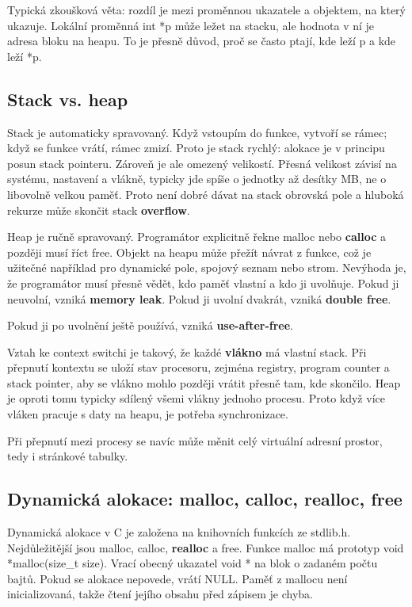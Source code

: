 Typická zkoušková věta: rozdíl je mezi proměnnou ukazatele a objektem, na který ukazuje. Lokální proměnná int *p může ležet na stacku, ale hodnota v ní je adresa bloku na heapu. To je přesně důvod, proč se často ptají, kde leží p a kde leží *p.

\subsection*{Stack vs. heap}

Stack je automaticky spravovaný. Když vstoupím do funkce, vytvoří se rámec; když se funkce vrátí, rámec zmizí. Proto je stack rychlý: alokace je v principu posun stack pointeru. Zároveň je ale omezený velikostí. Přesná velikost závisí na systému, nastavení a vlákně, typicky jde spíše o jednotky až desítky MB, ne o libovolně velkou paměť. Proto není dobré dávat na stack obrovská pole a hluboká rekurze může skončit stack \textbf{overflow}.

Heap je ručně spravovaný. Programátor explicitně řekne malloc nebo \textbf{calloc} a později musí říct free. Objekt na heapu může přežít návrat z funkce, což je užitečné například pro dynamické pole, spojový seznam nebo strom. Nevýhoda je, že programátor musí přesně vědět, kdo paměť vlastní a kdo ji uvolňuje. Pokud ji neuvolní, vzniká \textbf{memory leak}. Pokud ji uvolní dvakrát, vzniká \textbf{double free}.

Pokud ji po uvolnění ještě používá, vzniká \textbf{use-after-free}.

Vztah ke context switchi je takový, že každé \textbf{vlákno} má vlastní stack. Při přepnutí kontextu se uloží stav procesoru, zejména registry, program counter a stack pointer, aby se vlákno mohlo později vrátit přesně tam, kde skončilo. Heap je oproti tomu typicky sdílený všemi vlákny jednoho procesu. Proto když více vláken pracuje s daty na heapu, je potřeba synchronizace.

Při přepnutí mezi procesy se navíc může měnit celý virtuální adresní prostor, tedy i stránkové tabulky.

\subsection*{Dynamická alokace: malloc, calloc, realloc, free}

Dynamická alokace v C je založena na knihovních funkcích ze stdlib.h. Nejdůležitější jsou malloc, calloc, \textbf{realloc} a free. Funkce malloc má prototyp void *malloc(size\_t size). Vrací obecný ukazatel void * na blok o zadaném počtu bajtů. Pokud se alokace nepovede, vrátí NULL. Paměť z mallocu není inicializovaná, takže čtení jejího obsahu před zápisem je chyba.

